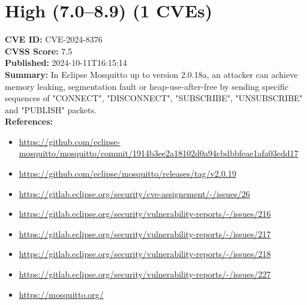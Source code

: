 \documentclass{article}
\begin{document}
\section*{High (7.0–8.9) (1 CVEs)}
\textbf{CVE ID:} CVE-2024-8376\\
\textbf{CVSS Score:} 7.5\\
\textbf{Published:} 2024-10-11T16:15:14\\
\textbf{Summary:} In Eclipse Mosquitto up to version 2.0.18a, an attacker can achieve memory leaking, segmentation fault or heap-use-after-free by sending specific sequences of "CONNECT", "DISCONNECT", "SUBSCRIBE", "UNSUBSCRIBE" and "PUBLISH" packets.\\
\textbf{References:}\\\begin{itemize}
\item \href{https://github.com/eclipse-mosquitto/mosquitto/commit/1914b3ee2a18102d0a94cbdbbfeae1afa03edd17}{https://github.com/eclipse-mosquitto/mosquitto/commit/1914b3ee2a18102d0a94cbdbbfeae1afa03edd17}
\item \href{https://github.com/eclipse/mosquitto/releases/tag/v2.0.19}{https://github.com/eclipse/mosquitto/releases/tag/v2.0.19}
\item \href{https://gitlab.eclipse.org/security/cve-assignement/-/issues/26}{https://gitlab.eclipse.org/security/cve-assignement/-/issues/26}
\item \href{https://gitlab.eclipse.org/security/vulnerability-reports/-/issues/216}{https://gitlab.eclipse.org/security/vulnerability-reports/-/issues/216}
\item \href{https://gitlab.eclipse.org/security/vulnerability-reports/-/issues/217}{https://gitlab.eclipse.org/security/vulnerability-reports/-/issues/217}
\item \href{https://gitlab.eclipse.org/security/vulnerability-reports/-/issues/218}{https://gitlab.eclipse.org/security/vulnerability-reports/-/issues/218}
\item \href{https://gitlab.eclipse.org/security/vulnerability-reports/-/issues/227}{https://gitlab.eclipse.org/security/vulnerability-reports/-/issues/227}
\item \href{https://mosquitto.org/}{https://mosquitto.org/}
\end{itemize}
\vspace{0.5cm}
\end{document}
